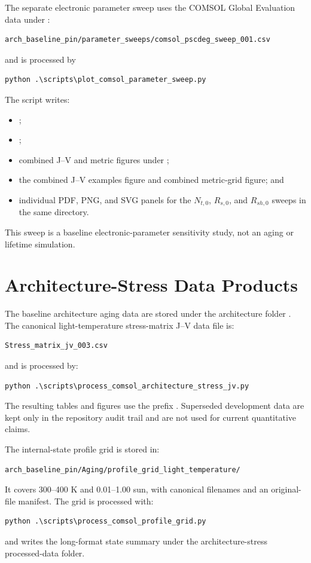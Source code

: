 The separate electronic parameter sweep uses the COMSOL Global Evaluation data
under :
\begin{verbatim}
arch_baseline_pin/parameter_sweeps/comsol_pscdeg_sweep_001.csv
\end{verbatim}
and is processed by
\begin{verbatim}
python .\scripts\plot_comsol_parameter_sweep.py
\end{verbatim}
The script writes:
\begin{itemize}
\item {};
\item {};
\item combined J--V and metric figures under
;
\item the combined J--V examples figure and combined metric-grid figure; and
\item individual PDF, PNG, and SVG panels for the $N_{t,0}$, $R_{s,0}$, and
$R_{sh,0}$ sweeps in the same directory.
\end{itemize}
This sweep is a baseline electronic-parameter sensitivity study, not an aging
or lifetime simulation.

\section{Architecture-Stress Data Products}

The baseline architecture aging data are stored under the architecture folder
. The canonical light-temperature stress-matrix
J--V data file is:
\begin{verbatim}
Stress_matrix_jv_003.csv
\end{verbatim}
and is processed by:
\begin{verbatim}
python .\scripts\process_comsol_architecture_stress_jv.py
\end{verbatim}
The resulting tables and figures use the prefix
. Superseded development data are
kept only in the repository audit trail and are not used for current
quantitative claims.

The internal-state profile grid is stored in:
\begin{verbatim}
arch_baseline_pin/Aging/profile_grid_light_temperature/
\end{verbatim}
It covers 300--400 K and 0.01--1.00 sun, with canonical filenames and an
original-file manifest. The grid is processed with:
\begin{verbatim}
python .\scripts\process_comsol_profile_grid.py
\end{verbatim}
and writes the long-format state summary under
the architecture-stress processed-data folder.
